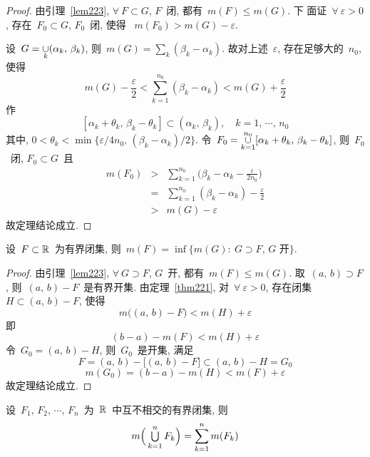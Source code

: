 \begin{proof}
由引理~\ref{lem223}, $\forall~F \subset G$, $F$~闭, 都有~$m(F) \leqslant m(G)$. 下
面证~$\forall~\varepsilon > 0$, 存在~$F_0 \subset G$,  $F_0$~闭, 使得
~$m(F_0) > m(G) - \varepsilon$.

设~$G = \mathop{\cup}\limits_k (\alpha_k,\,\beta_k)$, 则~$m(G) = \sum\limits_k(\beta_k -
\alpha_k)$. 故对上述~$\varepsilon$, 存在足够大的~$n_0$, 使得
\[
m(G) - \frac{\varepsilon}{2} < \sum^{n_0}_{k=1} (\beta_k - \alpha_k) < m(G) +
\frac{\varepsilon}{2}
\]
作
\[
[\alpha_k + \theta_k,\,\beta_k - \theta_k] \subset (\alpha_k,\,\beta_k),\quad
k=1,\,\cdots,\,n_0
\]
其中, $0< \theta_k < \min\big\{\varepsilon/4n_0,\,(\beta_k -
\alpha_k)/2 \big\}$. 令~$F_0 = \mathop{\cup}\limits_{k=1}^{n_0} [\alpha_k + \theta_k,\,\beta_k -
\theta_k]$, 则~$F_0$~闭, $F_0 \subset G$~且
\begin{eqnarray*}
m(F_0) &>& \sum^{n_0}_{k=1} \Big(\beta_k - \alpha_k - \frac{\varepsilon}{2n_0}\Big) \\
&=& \sum^{n_0}_{k=1} (\beta_k - \alpha_k) - \frac{\varepsilon}{2} \\
&>& m(G) - \varepsilon
\end{eqnarray*}
故定理结论成立.
\end{proof}

\begin{theorem} \label{thm222}
设~$F \subset \mathbb{R}$~为有界闭集, 则~$m(F) = \inf\big\{m(G): \: G \supset F,\,
G \mbox{~开}\big\}$.
\end{theorem}

\begin{proof}
由引理~\ref{lem223}, $\forall~G \supset F$, $G$~开, 都有~$m(F) \leqslant m(G)$.
取~$(a,\,b) \supset F$, 则~$(a,\,b) - F$~是有界开集. 由定理~\ref{thm221},
对~$\forall~\varepsilon > 0$, 存在闭集~$H \subset (a,\,b) - F$, 使得
\[
m\big((a,\,b) - F\big) < m(H) + \varepsilon
\]
即
\[
(b-a) - m(F) < m(H) + \varepsilon
\]
令~$G_0 = (a,\,b)-H$, 则~$G_0$~是开集, 满足
\[
F = (a,\,b) - \big[(a,\,b) - F\big] \subset (a,\,b) - H = G_0
\]
\[
m(G_0) = (b -a) - m(H) <  m(F) + \varepsilon
\]
故定理结论成立.
\end{proof}

\begin{proposition} \label{prop223}
设~$F_1,\,F_2,\,\cdots,\,F_n$~为~$\mathbb{R}$~中互不相交的有界闭集, 则
\[
m\Big( \mathop{\textstyle{\bigcup}}^n_{k=1} F_k \Big) = \sum^n_{k=1} m(F_k)
\]
\end{proposition}

